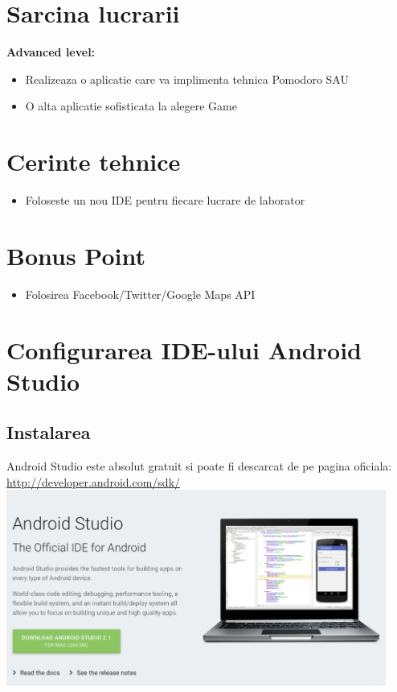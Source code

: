 \documentclass[12pt]{article}
\begin{document}
\section* {Sarcina lucrarii}
\textbf{Advanced level:}
\begin{itemize}
\item Realizeaza o aplicatie care va implimenta tehnica Pomodoro SAU
\item O alta aplicatie sofisticata la alegere
Game
\end{itemize}
\section* {Cerinte tehnice}
\begin{itemize}
\item Foloseste un nou IDE pentru fiecare lucrare de laborator
\end{itemize}
\section* {Bonus Point}
\begin{itemize}
\item Folosirea Facebook/Twitter/Google Maps API
\end{itemize}
\section {Configurarea IDE-ului Android Studio}
\subsection{Instalarea}
Android Studio este absolut gratuit si poate fi descarcat de pe pagina oficiala: \url{http://developer.android.com/sdk/}
\newpage 
\includegraphics[width=12.5cm]{images/1}
\end{document}
